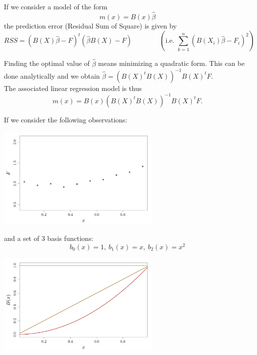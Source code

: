 \documentclass{beamer}
\begin{document}
\begin{frame}{}
If we consider a model of the form 
$$m(x) = B(x) \hat{\beta}$$
the prediction error (Residual Sum of Square) is given by 
$$RSS = (B(X) \hat{\beta}  - F)^t(\hat{\beta} B(X) - F)  \qquad \qquad \left( \text{i.e. } \sum_{k=1}^n ( B(X_i) \hat{\beta} - F_i)^2\right)$$ 

Finding the optimal value of $\hat{\beta}$ means minimizing a quadratic form. This can be done analytically and we obtain $\hat{\beta} = (B(X)^t B(X))^{-1} B(X)^t F$.\\
\vspace{3mm}
The associated linear regression model is thus
$$m(x) = B(x) (B(X)^t B(X))^{-1} B(X)^t F.$$
\end{frame}

\begin{frame}{}
\begin{example}
	If we consider the following observations: 
\begin{center}
  \includegraphics[height=5cm]{figures/R/linreg_0}
\end{center}
\end{example}
\end{frame}

\begin{frame}{}
\begin{example}
	and a set of 3 basis functions:
	 $$b_0(x)=1,\ b_1(x)=x,\ b_2(x)=x^2$$
\begin{center}
  \includegraphics[height=5cm]{figures/R/linreg_1}
\end{center}
\end{example}
\end{frame}
\end{document}
